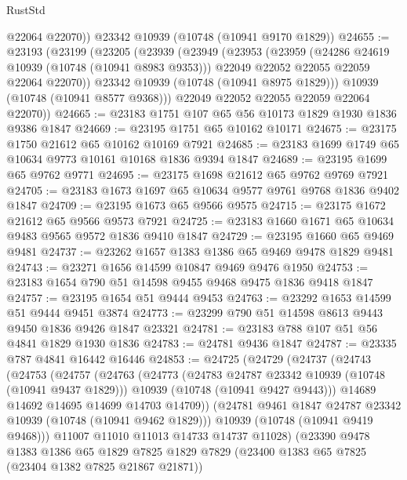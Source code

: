 \begin{lexlean}{RustStd}
\begin{coremodule}
{\begin{coremodule}
{{{{{        @22064
        @22070))
    @23342
    @10939
    (@10748 (@10941 @9170 @1829))
@24655 := @23193
    (@23199
      (@23205
        (@23939
          (@23949
            (@23953
              (@23959
                (@24286 @24619 @10939 (@10748 (@10941 @8983 @9353)))
                @22049
                @22052
                @22055
                @22059
                @22064
                @22070))
            @23342
            @10939
            (@10748 (@10941 @8975 @1829)))
          @10939
          (@10748 (@10941 @8577 @9368)))
        @22049
        @22052
        @22055
        @22059
        @22064
        @22070))
@24665 := @23183 @1751 @107 @65 @56 @10173 @1829 @1930 @1836 @9386 @1847
@24669 := @23195 @1751 @65 @10162 @10171
@24675 := @23175 @1750 @21612 @65 @10162 @10169 @7921
@24685 := @23183 @1699 @1749 @65 @10634 @9773 @10161 @10168 @1836 @9394 @1847
@24689 := @23195 @1699 @65 @9762 @9771
@24695 := @23175 @1698 @21612 @65 @9762 @9769 @7921
@24705 := @23183 @1673 @1697 @65 @10634 @9577 @9761 @9768 @1836 @9402 @1847
@24709 := @23195 @1673 @65 @9566 @9575
@24715 := @23175 @1672 @21612 @65 @9566 @9573 @7921
@24725 := @23183 @1660 @1671 @65 @10634 @9483 @9565 @9572 @1836 @9410 @1847
@24729 := @23195 @1660 @65 @9469 @9481
@24737 := @23262 @1657 @1383 @1386 @65 @9469 @9478 @1829 @9481
@24743 := @23271 @1656 @14599 @10847 @9469 @9476 @1950
@24753 := @23183 @1654 @790 @51 @14598 @9455 @9468 @9475 @1836 @9418 @1847
@24757 := @23195 @1654 @51 @9444 @9453
@24763 := @23292 @1653 @14599 @51 @9444 @9451 @3874
@24773 := @23299 @790 @51 @14598 @8613 @9443 @9450 @1836 @9426 @1847 @23321
@24781 := @23183 @788 @107 @51 @56 @4841 @1829 @1930 @1836
@24783 := @24781 @9436 @1847
@24787 := @23335 @787 @4841 @16442 @16446
@24853 := @24725
    (@24729
      (@24737
        (@24743
          (@24753
            (@24757
              (@24763
                (@24773
                  (@24783 @24787 @23342 @10939 (@10748 (@10941 @9437 @1829)))
                  @10939
                  (@10748 (@10941 @9427 @9443)))
                @14689
                @14692
                @14695
                @14699
                @14703
                @14709))
            (@24781 @9461 @1847 @24787 @23342 @10939 (@10748 (@10941 @9462 @1829)))
            @10939
            (@10748 (@10941 @9419 @9468)))
          @11007
          @11010
          @11013
          @14733
          @14737
          @11028)
        (@23390
          @9478
          @1383
          @1386
          @65
          @1829
          @7825
          @1829
          @7829
          (@23400 @1383 @65 @7825 (@23404 @1382 @7825 @21867 @21871))
}}}}}
\end{coremodule}}
\end{coremodule}
\end{lexlean}
